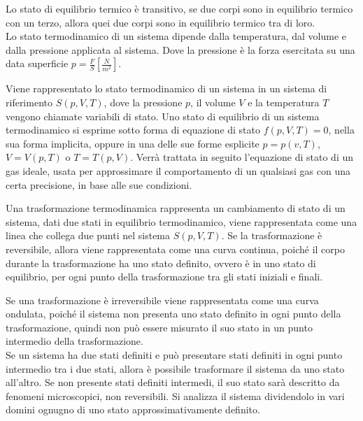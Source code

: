 \documentclass{article}
\numberwithin{equation}{subsection}
\begin{document}
Lo stato di equilibrio 
termico è transitivo, se due corpi sono in equilibrio termico 
con un terzo, allora quei due corpi sono in equilibrio termico 
tra di loro. 
\\
Lo stato termodinamico di un sistema dipende dalla temperatura, 
dal volume e dalla pressione applicata al sistema. Dove la pressione 
è la forza esercitata su una data superficie $p=\displaystyle\frac{F}{S}\left[\displaystyle\frac{N}{m^2}\right]$. 



Viene rappresentato lo stato termodinamico di un sistema in un sistema di 
riferimento $S(p,V,T)$, dove la pressione $p$, il volume $V$ e la temperatura $T$ vengono chiamate variabili di stato. 
Uno stato di equilibrio di un sistema termodinamico si esprime sotto forma di equazione di stato $f(p,V,T)=0$, nella sua forma implicita, oppure in una delle sue forme 
esplicite $p=p(v,T)$, $V=V(p,T)$ o $T=T(p,V)$. Verrà trattata in seguito l'equazione di stato di un gas ideale, usata per approssimare il comportamento di un qualsiasi 
gas con una certa precisione, in base alle sue condizioni. 



Una trasformazione termodinamica rappresenta un cambiamento di stato di un sistema, dati due stati in equilibrio termodinamico, viene 
rappresentata come una linea che collega due punti nel sistema $S(p,V,T)$. Se la trasformazione è reversibile, 
allora viene rappresentata come una curva continua, poiché 
il corpo durante la trasformazione ha uno stato definito, ovvero 
è in uno stato di equilibrio, per ogni punto della trasformazione tra gli stati iniziali e finali. 



Se una trasformazione 
è irreversibile viene rappresentata come una curva ondulata, 
poiché il sistema non presenta uno stato definito in ogni 
punto della trasformazione, quindi non può essere misurato il suo 
stato in un punto intermedio della trasformazione. 
\\
Se un sistema ha due stati definiti e può presentare stati 
definiti in ogni punto intermedio tra i due stati, allora è 
possibile trasformare il sistema da uno stato all'altro. Se non 
presente stati definiti intermedi, il suo stato sarà descritto da 
fenomeni microscopici, non reversibili. Si analizza il sistema dividendolo in vari domini ognugno di uno stato approssimativamente definito.  

\begin{center}\end{center}
\end{document}
